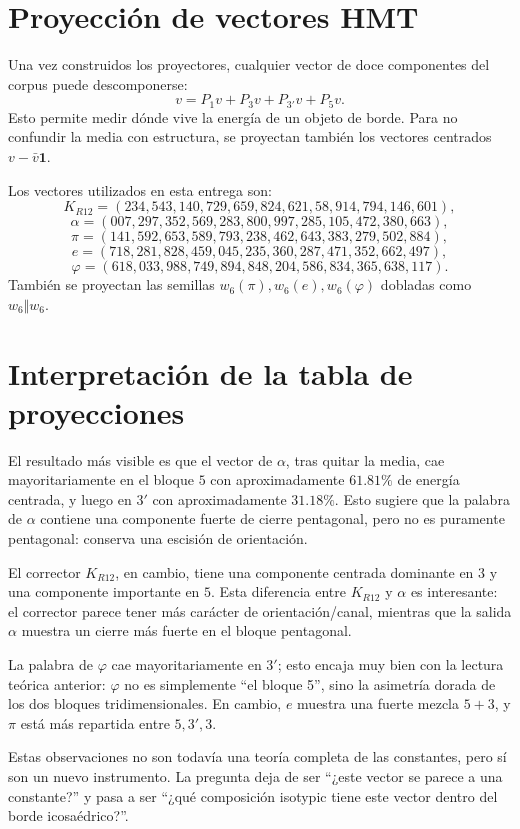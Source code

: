 \documentclass[11pt,a4paper]{article}
\begin{document}
\section{Proyección de vectores HMT}
Una vez construidos los proyectores, cualquier vector de doce componentes del corpus puede descomponerse:
\[
v=P_1v+P_3v+P_{3'}v+P_5v.
\]
Esto permite medir dónde vive la energía de un objeto de borde. Para no confundir la media con estructura, se proyectan también los vectores centrados $v-\bar v\mathbf 1$.

Los vectores utilizados en esta entrega son:
\[
K_{R12}=(234,543,140,729,659,824,621,58,914,794,146,601),
\]
\[
\alpha=(007,297,352,569,283,800,997,285,105,472,380,663),
\]
\[
\pi=(141,592,653,589,793,238,462,643,383,279,502,884),
\]
\[
e=(718,281,828,459,045,235,360,287,471,352,662,497),
\]
\[
\varphi=(618,033,988,749,894,848,204,586,834,365,638,117).
\]
También se proyectan las semillas $w_6(\pi),w_6(e),w_6(\varphi)$ dobladas como $w_6\Vert w_6$.



\section{Interpretación de la tabla de proyecciones}
El resultado más visible es que el vector de $\alpha$, tras quitar la media, cae mayoritariamente en el bloque $5$ con aproximadamente $61.81\%$ de energía centrada, y luego en $3'$ con aproximadamente $31.18\%$. Esto sugiere que la palabra de $\alpha$ contiene una componente fuerte de cierre pentagonal, pero no es puramente pentagonal: conserva una escisión de orientación.

El corrector $K_{R12}$, en cambio, tiene una componente centrada dominante en $3$ y una componente importante en $5$. Esta diferencia entre $K_{R12}$ y $\alpha$ es interesante: el corrector parece tener más carácter de orientación/canal, mientras que la salida $\alpha$ muestra un cierre más fuerte en el bloque pentagonal.

La palabra de $\varphi$ cae mayoritariamente en $3'$; esto encaja muy bien con la lectura teórica anterior: $\varphi$ no es simplemente ``el bloque 5'', sino la asimetría dorada de los dos bloques tridimensionales. En cambio, $e$ muestra una fuerte mezcla $5+3$, y $\pi$ está más repartida entre $5,3',3$.

Estas observaciones no son todavía una teoría completa de las constantes, pero sí son un nuevo instrumento. La pregunta deja de ser ``¿este vector se parece a una constante?'' y pasa a ser ``¿qué composición isotypic tiene este vector dentro del borde icosaédrico?''.
\end{document}
